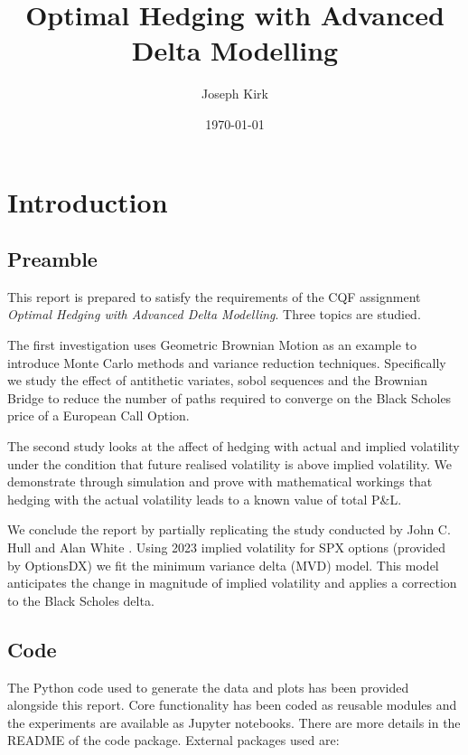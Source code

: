 \documentclass{article}
\newcommand{\para}{\vspace{8pt}} %
\begin{document}
\title{Optimal Hedging with Advanced Delta Modelling }
\author{Joseph Kirk}
\date{\today}

\maketitle

\newpage
\tableofcontents

\newpage
\section{Introduction}

\subsection{Preamble}
This report is prepared to satisfy the requirements of the CQF assignment \textit{Optimal Hedging with Advanced Delta Modelling}. Three topics are studied.

\para
The first investigation uses Geometric Brownian Motion as an example to introduce Monte Carlo methods and variance reduction techniques. 
Specifically we study the effect of antithetic variates, sobol sequences and the Brownian Bridge to reduce the number of paths required to converge on the Black Scholes 
price of a European Call Option.

\para
The second study looks at the affect of hedging with actual and implied volatility under the condition that future realised volatility is
above implied volatility.  We demonstrate through simulation and prove with mathematical workings that hedging with the actual volatility leads to a known value of total 
P\&L.  

\para
We conclude the report by partially replicating the study conducted by John C. Hull and Alan White \cite{hull}. Using 2023 implied volatility for SPX options (provided by OptionsDX)
we fit the minimum variance delta (MVD) model. This model anticipates the change in magnitude of implied volatility and applies a correction to the Black Scholes delta.

\subsection{Code}

The Python code used to generate the data and plots has been provided alongside this report. Core functionality has been coded as reusable modules and the experiments
are available as Jupyter notebooks. There are more details in the README of the code package.  External packages used are:
\end{document}
